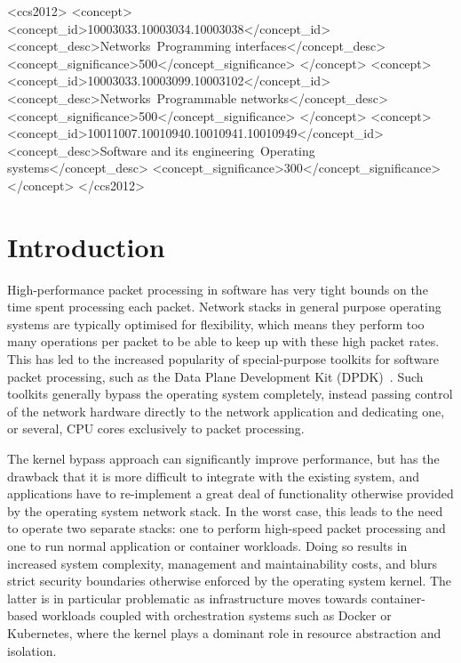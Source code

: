 \documentclass[sigconf]{acmart}
\begin{document}
 \begin{CCSXML}
<ccs2012>
<concept>
<concept_id>10003033.10003034.10003038</concept_id>
<concept_desc>Networks~Programming interfaces</concept_desc>
<concept_significance>500</concept_significance>
</concept>
<concept>
<concept_id>10003033.10003099.10003102</concept_id>
<concept_desc>Networks~Programmable networks</concept_desc>
<concept_significance>500</concept_significance>
</concept>
<concept>
<concept_id>10011007.10010940.10010941.10010949</concept_id>
<concept_desc>Software and its engineering~Operating systems</concept_desc>
<concept_significance>300</concept_significance>
</concept>
</ccs2012>
\end{CCSXML}


\maketitle

\section{Introduction}%
\label{sec:introduction}
High-performance packet processing in software has very tight bounds on the time
spent processing each packet. Network stacks in general purpose operating
systems are typically optimised for flexibility, which means they perform too
many operations per packet to be able to keep up with these high packet rates.
This has led to the increased popularity of special-purpose toolkits for
software packet processing, such as the Data Plane Development Kit
(DPDK)~\cite{dpdk}. Such toolkits generally bypass the operating system
completely, instead passing control of the network hardware directly to the
network application and dedicating one, or several, CPU cores exclusively to
packet processing.

The kernel bypass approach can significantly improve performance, but has the
drawback that it is more difficult to integrate with the existing system, and
applications have to re-implement a great deal of functionality otherwise
provided by the operating system network stack. In the worst case, this leads to
the need to operate two separate stacks: one to perform high-speed packet
processing and one to run normal application or container workloads. Doing so
results in increased system complexity, management and maintainability costs,
and blurs strict security boundaries otherwise enforced by the operating system
kernel. The latter is in particular problematic as infrastructure moves towards
container-based workloads coupled with orchestration systems such as Docker or
Kubernetes, where the kernel plays a dominant role in resource abstraction and
isolation.
\end{document}
